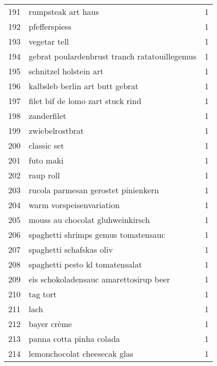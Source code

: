 \begin{tabular}{llr}
191 &                                 rumpsteak art haus &      1 \\
192 &                                      pfefferspiess &      1 \\
193 &                                       vegetar tell &      1 \\
194 &      gebrat poulardenbrust tranch ratatouillegemus &      1 \\
195 &                             schnitzel holstein art &      1 \\
196 &                    kalbsleb berlin art butt gebrat &      1 \\
197 &                  filet bif de lomo zart stuck rind &      1 \\
198 &                                        zanderfilet &      1 \\
199 &                                    zwiebelrostbrat &      1 \\
200 &                                        classic set &      1 \\
201 &                                          futo maki &      1 \\
202 &                                          raup roll &      1 \\
203 &                rucola parmesan gerostet pinienkern &      1 \\
204 &                           warm vorspeisenvariation &      1 \\
205 &                   mouss au chocolat gluhweinkirsch &      1 \\
206 &                spaghetti shrimps gemus tomatensauc &      1 \\
207 &                           spaghetti schafskas oliv &      1 \\
208 &                    spaghetti pesto kl tomatensalat &      1 \\
209 &             eis schokoladensauc amarettosirup beer &      1 \\
210 &                                           tag tort &      1 \\
211 &                                               lach &      1 \\
212 &                                        bayer crème &      1 \\
213 &                           panna cotta pinha colada &      1 \\
214 &                       lemonchocolat cheesecak glas &      1 \\

\end{tabular}
